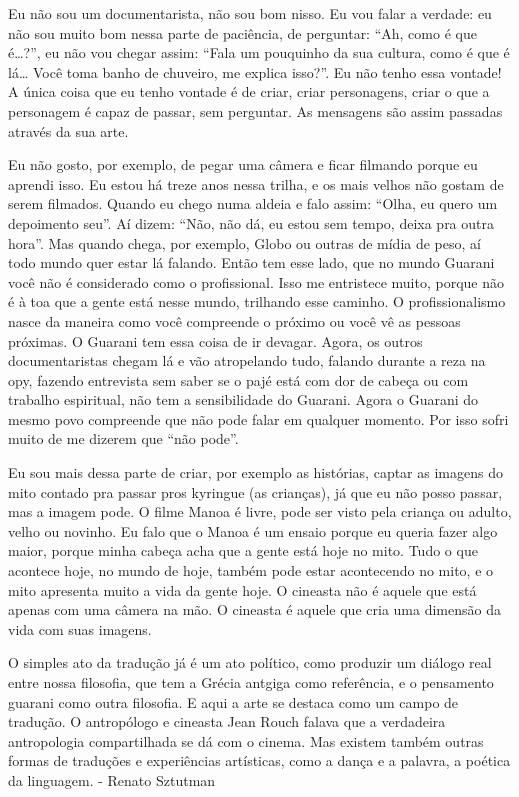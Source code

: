 Eu não sou um documentarista, não sou bom nisso. Eu vou falar a verdade:
eu não sou muito bom nessa parte de paciência, de perguntar: ``Ah, como
é que é\ldots{}?'', eu não vou chegar assim: ``Fala um pouquinho da sua
cultura, como é que é lá\ldots{} Você toma banho de chuveiro, me explica
isso?''. Eu não tenho essa vontade! A única coisa que eu tenho vontade é
de criar, criar personagens, criar o que a personagem é capaz de
passar, sem perguntar. As mensagens são assim passadas através da sua
arte. 

Eu não gosto, por exemplo, de pegar uma câmera e ficar filmando porque
eu aprendi isso. Eu estou há treze anos nessa trilha, e os mais velhos
não gostam de serem filmados. Quando eu chego numa aldeia e falo assim:
``Olha, eu quero um depoimento seu''. Aí dizem: ``Não, não dá, eu estou
sem tempo, deixa pra outra hora''. Mas quando chega, por exemplo, Globo
ou outras de mídia de peso, aí todo mundo quer estar lá falando. Então
tem esse lado, que no mundo Guarani você não é considerado como o
profissional. Isso me entristece muito, porque não é à toa que a gente
está nesse mundo, trilhando esse caminho. O profissionalismo nasce da
maneira como você compreende o próximo ou você vê as pessoas próximas.
O Guarani tem essa coisa de ir devagar. Agora, os outros
documentaristas chegam lá e vão atropelando tudo, falando durante a
reza na opy, fazendo entrevista sem saber se o pajé está com dor de
cabeça ou com trabalho espiritual, não tem a sensibilidade do Guarani.
Agora o Guarani do mesmo povo compreende que não pode falar em qualquer
momento. Por isso sofri muito de me dizerem que ``não pode''.

Eu sou mais dessa parte de criar, por exemplo as histórias, captar as
imagens do mito contado pra passar pros kyringue (as
crianças), já que eu não posso passar, mas a imagem pode. O filme Manoa
é livre, pode ser visto pela criança ou adulto, velho ou novinho. Eu
falo que o Manoa é um ensaio porque eu queria fazer algo maior, porque
minha cabeça acha que a gente está hoje no mito. Tudo o que acontece
hoje, no mundo de hoje, também pode estar acontecendo no mito, e o mito
apresenta muito a vida da gente hoje. O cineasta não é aquele que está
apenas com uma câmera na mão. O cineasta é aquele que cria uma dimensão
da vida com suas imagens.

O simples ato da tradução já é um ato político, como produzir um diálogo
real entre nossa filosofia, que tem a Grécia antgiga como referência, e
o pensamento guarani como outra filosofia. E aqui a arte se destaca
como um campo de tradução. O antropólogo e cineasta Jean Rouch falava
que a verdadeira antropologia compartilhada se dá com o cinema. Mas
existem também outras formas de traduções e experiências artísticas,
como a dança e a palavra, a poética da linguagem. - Renato Sztutman

